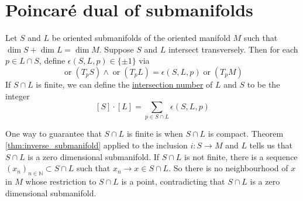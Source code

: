 \section{Poincar\'e dual of submanifolds}
\begin{defn} %
	Let $S$ and  $L$ be oriented submanifolds of the
	oriented manifold  $M$ such that  $\dim S + \dim L = \dim M$. Suppose 
	 $S$ and  $L$ intersect transversely. Then for each  $p\in L\cap S$, define
	 $\epsilon(S,L,p) \in \{\pm 1\}$ via
	 \[
		 \operatorname{or}(T_pS) \wedge \operatorname{or}(T_pL)
		 = \epsilon(S,L,p) \operatorname{or}(T_p M)
	 \] 
	 If $S\cap L$ is finite, we can define the
	 \underline{intersection number} of  $L$ and  $S$ to be the integer
	  \[
		  [S]\cdot [L] = \sum_{p\in S\cap L} \epsilon(S,L,p)
	 \] 
\end{defn}
\begin{remark}
	One way to guarantee that $S\cap L$ is finite is when $S\cap L$ is compact. 
	Theorem \ref{thm:inverse_submanifold} applied to
the inclusion $i: S \to M$ and  $L$ tells us that  $S\cap L$ is a zero
dimensional submanifold. If $S\cap L$ is not finite, there is a sequence  
$(x_n)_{n\in \mathbb{N}} \subset S\cap L$ such that $x_n \to x \in S\cap L$. So 
there is no neighbourhood of $x$ in $M$ whose restriction to $S\cap L$ is a
point, contradicting that $S\cap L$ is a zero dimensional submanifold. 
\end{remark}

